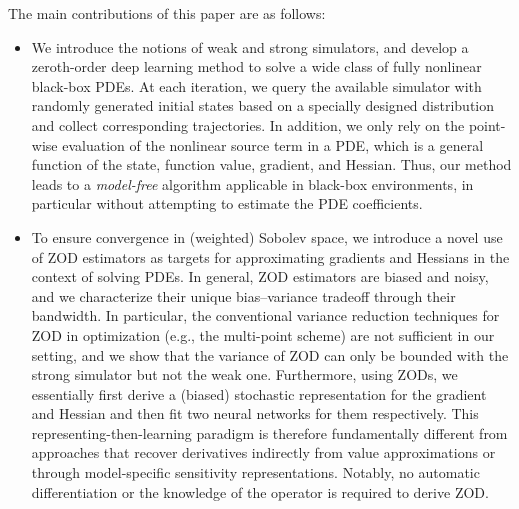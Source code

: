 \documentclass[twoside,11pt]{article}
\newcommand{\1}{\mathbf{1}}
\numberwithin{equation}{section}
\begin{document}
The main contributions of this paper are as follows:
\begin{itemize}
\item We introduce the notions of weak and strong simulators, and develop a zeroth-order deep learning method to solve a wide class of fully nonlinear black-box PDEs.  At each iteration, we query the available simulator with randomly generated initial states based on a specially designed distribution and collect corresponding trajectories. In addition, we only rely on the point-wise evaluation of the nonlinear source term in a PDE, which is a general function of the state, function value, gradient, and Hessian. Thus, our method leads to a {\it model-free} algorithm applicable in black-box environments, in particular without attempting to estimate the PDE coefficients.
\item To ensure convergence in (weighted) Sobolev space, we introduce a novel use of ZOD estimators as targets for approximating gradients and Hessians in the context of solving PDEs. In general, ZOD estimators are biased and noisy, and we characterize their unique bias--variance tradeoff through their bandwidth. In particular, the conventional variance reduction techniques for ZOD in optimization (e.g., the multi-point scheme) are not sufficient in our setting, and we show that the variance of ZOD can only be bounded with the strong simulator but not the weak one. Furthermore, using ZODs, we essentially first derive a (biased) stochastic representation for the gradient and Hessian and then fit two neural networks for them respectively. %
This representing-then-learning paradigm is therefore fundamentally different from approaches that recover derivatives indirectly from value approximations or through model-specific sensitivity representations.
Notably, no automatic differentiation or the knowledge of the operator is required to derive ZOD.

\end{itemize}
\end{document}
